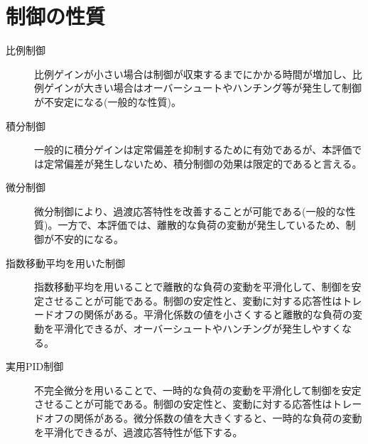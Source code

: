 \documentclass[a4j]{ujarticle}
\begin{document}
\clearpage
\section{制御の性質}
\begin{description}
  \item[比例制御] 比例ゲインが小さい場合は制御が収束するまでにかかる時間が増加し、比例ゲインが大きい場合はオーバーシュートやハンチング等が発生して制御が不安定になる(一般的な性質)。
  \item[積分制御] 一般的に積分ゲインは定常偏差を抑制するために有効であるが、本評価では定常偏差が発生しないため、積分制御の効果は限定的であると言える。
  \item[微分制御] 微分制御により、過渡応答特性を改善することが可能である(一般的な性質)。一方で、本評価では、離散的な負荷の変動が発生しているため、制御が不安的になる。
  \item[指数移動平均を用いた制御] 指数移動平均を用いることで離散的な負荷の変動を平滑化して、制御を安定させることが可能である。制御の安定性と、変動に対する応答性はトレードオフの関係がある。平滑化係数の値を小さくすると離散的な負荷の変動を平滑化できるが、オーバーシュートやハンチングが発生しやすくなる。
  \item[実用PID制御] 不完全微分を用いることで、一時的な負荷の変動を平滑化して制御を安定させることが可能である。制御の安定性と、変動に対する応答性はトレードオフの関係がある。微分係数の値を大きくすると、一時的な負荷の変動を平滑化できるが、過渡応答特性が低下する。
\end{description}
\end{document}

